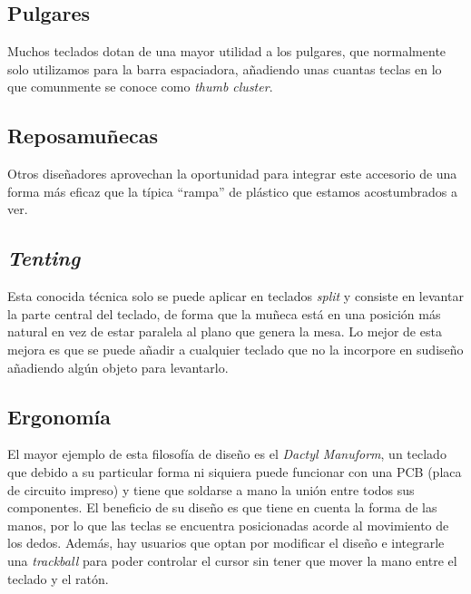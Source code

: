     \subsection{Pulgares}
    Muchos teclados dotan de una mayor utilidad a los pulgares, que normalmente solo utilizamos para la barra espaciadora, añadiendo unas cuantas teclas en lo que comunmente se conoce como \textit{thumb cluster}.

    \subsection{Reposamuñecas}
    Otros diseñadores aprovechan la oportunidad para integrar este accesorio de una forma más eficaz que la típica ``rampa'' de plástico que estamos acostumbrados a ver.

    \subsection{\textit{Tenting}}
    Esta conocida técnica solo se puede aplicar en teclados \textit{split} y consiste en levantar la parte central del teclado, de forma que la muñeca está en una posición más natural en vez de estar paralela al plano que genera la mesa. Lo mejor de esta mejora es que se puede añadir a cualquier teclado que no la incorpore en sudiseño añadiendo algún objeto para levantarlo.

    \subsection{Ergonomía}
    El mayor ejemplo de esta filosofía de diseño es el \textit{Dactyl Manuform}, un teclado que debido a su particular forma ni siquiera puede funcionar con una PCB (placa de circuito impreso) y tiene que soldarse a mano la unión entre todos sus componentes. El beneficio de su diseño es que tiene en cuenta la forma de las manos, por lo que las teclas se encuentra posicionadas acorde al movimiento de los dedos. Además, hay usuarios que optan por modificar el diseño e integrarle una \textit{trackball} para poder controlar el cursor sin tener que mover la mano entre el teclado y el ratón.
